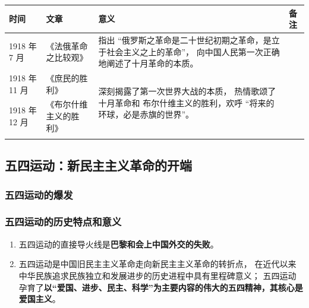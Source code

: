 \documentclass[10pt, UTF8]{book} %
\begin{document}
{ %
\label{李大钊的文章} %
\begin{longtable}{p{6em}p{10em}p{14em}p{10em}}
    \hline
    \textbf{时间} & \textbf{文章} & \textbf{意义} & \textbf{备注} \\
    \hline
    \endhead
    \hline
    \endfoot

    1918 年 7 月 & 《法俄革命之比较观》
    & 指出 “俄罗斯之革命是二十世纪初期之革命，是立于社会主义之上的革命”，
    向中国人民第一次正确地阐述了十月革命的本质。 \\
    \hline
    1918 年 11 月 & 《庶民的胜利》 & \multirow{2}{14em}{
        深刻揭露了第一次世界大战的本质， 热情歌颂了十月革命和
        布尔什维主义的胜利，欢呼 “将来的环球，必是赤旗的世界”。
    }\\ 
    1918 年 12 月 & 《布尔什维主义的胜利》 & \\ \\
\end{longtable}}


\subsection{五四运动：新民主主义革命的开端}

\subsubsection{五四运动的爆发}
\subsubsection{五四运动的历史特点和意义}


\begin{mdframed}[frametitle={五四运动：中国新民主主义革命的开端}]
    \begin{enumerate}[itemsep=0pt]
        \item 五四运动的直接导火线是\textbf{巴黎和会上中国外交的失败}。
        \item 五四运动是中国旧民主主义革命走向新民主主义革命的转折点，
        在近代以来中华民族追求民族独立和发展进步的历史进程中具有里程碑意义；
        五四运动孕育了\textbf{以“爱国、进步、民主、科学”为主要内容的伟大的五四精神，其核心是爱国主义}。
    \end{enumerate}
\end{mdframed}
\end{document}
